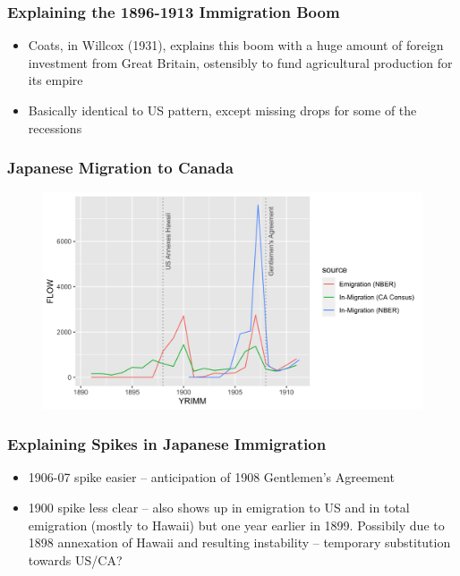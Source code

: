 \documentclass[pdf]{beamer}
\begin{document}
\begin{frame}
    \frametitle{Explaining the 1896-1913 Immigration Boom}
    \begin{itemize}
        \item Coats, in Willcox (1931), explains this boom with a huge amount of foreign investment from Great Britain, ostensibly to fund agricultural production for its empire
        \item Basically identical to US pattern, except missing drops for some of the recessions
    \end{itemize}
\end{frame}

\begin{frame}[label = japan_flow]
    \frametitle{Japanese Migration to Canada}
    \centering
    \begin{figure}
        \includegraphics[width = \textwidth]{../../figs/6sep23/japan_flow.png}
    \end{figure}
\end{frame}

\begin{frame}
    \frametitle{Explaining Spikes in Japanese Immigration}
    \begin{itemize}
        \item 1906-07 spike easier -- anticipation of 1908 Gentlemen's Agreement
        \item 1900 spike less clear -- also shows up in emigration to US and in total emigration (mostly to Hawaii) but one year earlier in 1899. Possibily due to 1898 annexation of Hawaii and resulting instability -- temporary substitution towards US/CA? 
        \hyperlink{japan_emig}{}
    \end{itemize}
\end{frame}
\end{document}

